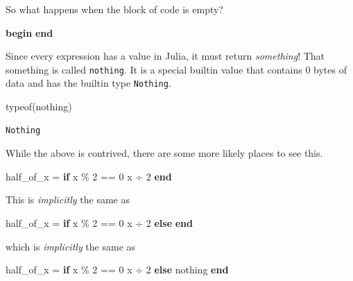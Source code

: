 \documentclass[
]{article}
\newenvironment{Shaded}{\begin{snugshade}}{\end{snugshade}}
\newcommand{\ConstantTok}[1]{\textcolor[rgb]{0.56,0.35,0.01}{#1}}
\newcommand{\ControlFlowTok}[1]{\textcolor[rgb]{0.00,0.23,0.31}{\textbf{#1}}}
\newcommand{\FloatTok}[1]{\textcolor[rgb]{0.68,0.00,0.00}{#1}}
\newcommand{\FunctionTok}[1]{\textcolor[rgb]{0.28,0.35,0.67}{#1}}
\newcommand{\NormalTok}[1]{\textcolor[rgb]{0.00,0.23,0.31}{#1}}
\newcommand{\OperatorTok}[1]{\textcolor[rgb]{0.37,0.37,0.37}{#1}}
\begin{document}
So what happens when the block of code is empty?

\begin{Shaded}
\begin{Highlighting}[]
\ControlFlowTok{begin}
\ControlFlowTok{end}
\end{Highlighting}
\end{Shaded}

Since every expression has a value in Julia, it must return
\emph{something}! That something is called \texttt{nothing}. It is a
special builtin value that contains 0 bytes of data and has the builtin
type \texttt{Nothing}.

\begin{Shaded}
\begin{Highlighting}[]
\FunctionTok{typeof}\NormalTok{(}\ConstantTok{nothing}\NormalTok{)}
\end{Highlighting}
\end{Shaded}

\begin{verbatim}
Nothing
\end{verbatim}

While the above is contrived, there are some more likely places to see
this.

\begin{Shaded}
\begin{Highlighting}[]
\NormalTok{half\_of\_x }\OperatorTok{=} \ControlFlowTok{if}\NormalTok{ x }\OperatorTok{\%} \FloatTok{2} \OperatorTok{==} \FloatTok{0}
\NormalTok{   x }\OperatorTok{÷} \FloatTok{2}
\ControlFlowTok{end}
\end{Highlighting}
\end{Shaded}

This is \emph{implicitly} the same as

\begin{Shaded}
\begin{Highlighting}[]
\NormalTok{half\_of\_x }\OperatorTok{=} \ControlFlowTok{if}\NormalTok{ x }\OperatorTok{\%} \FloatTok{2} \OperatorTok{==} \FloatTok{0}
\NormalTok{   x }\OperatorTok{÷} \FloatTok{2}
\ControlFlowTok{else}
\ControlFlowTok{end}
\end{Highlighting}
\end{Shaded}

which is \emph{implicitly} the same as

\begin{Shaded}
\begin{Highlighting}[]
\NormalTok{half\_of\_x }\OperatorTok{=} \ControlFlowTok{if}\NormalTok{ x }\OperatorTok{\%} \FloatTok{2} \OperatorTok{==} \FloatTok{0}
\NormalTok{   x }\OperatorTok{÷} \FloatTok{2}
\ControlFlowTok{else}
   \ConstantTok{nothing}
\ControlFlowTok{end}
\end{Highlighting}
\end{Shaded}
\end{document}
